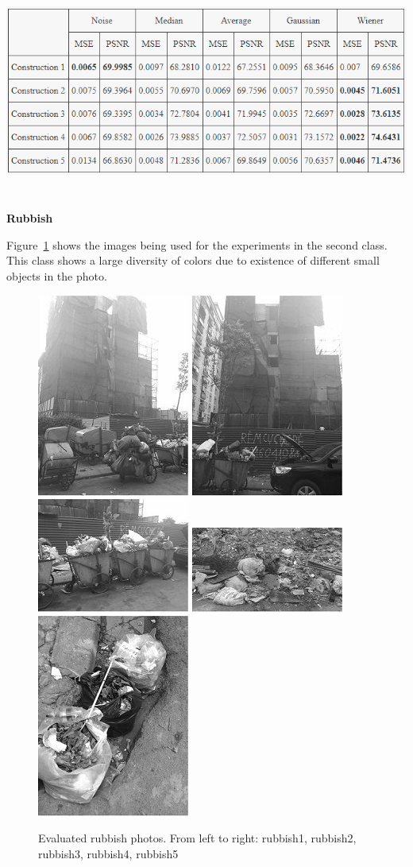 \begin{center}
\includegraphics[width=15cm,height=7cm]{images/Construction.png}
\end{center}

\newpage

\textbf{Rubbish}

Figure~\ref{fig:rubbish} shows the images being used for the experiments in the second class. This class shows a large diversity of colors due to existence of different small objects in the photo.

\begin{figure}[h]
	\centering
	\includegraphics[width=0.18\columnwidth]{images/rubbish1.jpg}
	\includegraphics[width=0.18\columnwidth]{images/rubbish2.jpg}
	\includegraphics[width=0.18\columnwidth]{images/rubbish3.jpg}
	\includegraphics[width=0.18\columnwidth]{images/rubbish4.jpg}
	\includegraphics[width=0.18\columnwidth]{images/rubbish5.jpg}
	\caption{Evaluated rubbish photos. From left to right: rubbish1, rubbish2, rubbish3, rubbish4, rubbish5}
	\label{fig:rubbish}
\end{figure}

